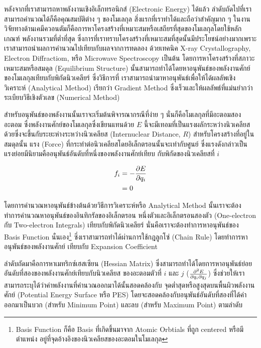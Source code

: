 หลังจากที่เราสามารถหาพลังงานเชิงอิเล็กทรอนิกส์ (Electronic Energy) ได้แล้ว ลำดับถัดไปที่เราสามารถคำนวณได้ก็คือคุณสมบัติต่าง ๆ ของโมเลกุล
สิ่งแรกที่เราทำได้และถือว่าสำคัญมาก ๆ ในงานวิจัยทางด้านเคมีควอนตัมก็คือการหาโครงสร้างที่เหมาะสมหรือเสถียรที่สุดของโมเลกุลโดยใช้หลักเกณฑ์%
พลังงานรวมที่ต่ำที่สุด ซึ่งการที่เราทราบโครงสร้างที่เหมาะสมที่สุดนั้นมีประโยชน์อย่างมากเพราะเราสามารถนำผลการคำนวณไปเทียบกับผลจากการทดลอง%
ด้วยเทคนิค X-ray Crystallography, Electron Diffractiom, หรือ Microwave Spectroscopy เป็นต้น โดยการหาโครงสร้างที่สภาวะ%
เหมาะสมหรือสมดุล (Equilibrium Structure) นั้นสามารถทำได้โดยหาอนุพันธ์ของพลังงานศักย์ของโมเลกุลเทียบกับพิกัดนิวเคลียร์ ซึ่งวิธีการที่%
เราสามารถนำมาหาอนุพันธ์เพื่อให้ได้ผลลัพเชิงวิเคราะห์ (Analytical Method) เรียกว่า Gradient Method ซึ่งเร็วและให้ผลลัพธ์ที่แม่นยำกว่า%
ระเบียบวิธีเชิงตัวเลข (Numerical Method)

สำหรับอนุพันธ์ของพลังงานนั้นเราจะเริ่มต้นพิจารณากรณีที่ง่าย ๆ นั่นก็คือโมเลกุลที่มีอะตอมสองอะตอม ซึ่งพลังงานศักย์ของโมเลกุลซึ่งเขียนแทนด้วย $E$ 
นี้จะมีเทอมที่เป็นแรงผลักระหว่างนิวเคลียสด้วยซึ่งจะขึ้นกับระยะห่างระหว่างนิวเคลียส (Internuclear Distance, $R$) สำหรับโครงสร้างที่อยู่ในสมดุลนั้น 
แรง (Force) ที่กระทำต่อนิวเคลียสโดยอิเล็กตรอนนั้นจะเท่ากับศูนย์ ซึ่งแรงดังกล่าวเป็นแรงย่อยมีนิยามคืออนุพันธ์อันดับที่หนึ่งของพลังงานศักย์เทียบ%
กับพิกัดของนิวเคลียสที่ $i$

\begin{align}
    f_{i} &= - \pdv{E}{q_{i}} \\
    &= 0
\end{align}

โดยการคำนวณหาอนุพันธ์ข้างต้นด้วยวิธีการวิเคราะห์หรือ Analytical Method นั้นเราจะต้องทำการคำนวณหาอนุพันธ์ของอินทิกรัลของอิเล็กตรอน%
หนึ่งตัวและอิเล็กตรอนสองตัว (One-electron กับ Two-electron Integrals) เทียบกับพิกัดนิวเคลียร์ นั่นคือเราจะต้องทำการหาอนุพันธ์ของ 
Basis Function นั่นเอง\footnote{Basis Function ก็คือ Basis ที่เกิดขึ้นมาจาก Atomic Orbtials ที่ถูก centered หรือมีตำแหน่ง%
อยู่ที่จุดอ้างอิงของนิวเคลียสของอะตอมในโมเลกุล} ซึ่งเราสามารถทำได้ผ่านการใช้กฎลูกโซ่ (Chain Rule) โดยทำการหาอนุพันธ์ของพลังงานศักย์%
เทียบกับ Expansion Coefficient

ลำดับถัดมาคือการหาเมทริกซ์เฮสเซียน (Hessian Matrix) ซึ่งสามารถทำได้โดยการหาอนุพันธ์ย่อยอันดับที่สองของพลังงานศักย์เทียบกับนิวเคลียส%
ของอะตอมตัวที่ $i$ และ $j$ ($\pdv{E}{q_{i}}{q_{j}}$) ซึ่งช่วยให้เราสามารถระบุได้ว่าค่าพลังงานที่คำนวณออกมาได้นั้นสอดคล้องกับ%
จุดต่ำสุดหรือสูงสุดบนพื้นผิวพลังงานศักย์ (Potential Energy Surface หรือ PES) โดยจะสอดคล้องกับอนุพันธ์อันดับที่สองที่ได้ค่าออกมาเป็นบวก 
(สำหรับ Minimum Point) และลบ (สำหรับ Maximum Point) ตามลำดับ

